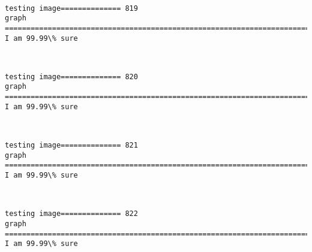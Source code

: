 \documentclass[11pt]{article}
\begin{document}
    \begin{center}
    \end{center}
    { \hspace*{\fill} \\}
    
    \begin{Verbatim}[commandchars=\\\{\}]
testing image============== 819
graph
============================================================================
I am 99.99\% sure

    \end{Verbatim}

    \begin{center}
    \end{center}
    { \hspace*{\fill} \\}
    
    \begin{Verbatim}[commandchars=\\\{\}]
testing image============== 820
graph
============================================================================
I am 99.99\% sure

    \end{Verbatim}

    \begin{center}
    \end{center}
    { \hspace*{\fill} \\}
    
    \begin{Verbatim}[commandchars=\\\{\}]
testing image============== 821
graph
============================================================================
I am 99.99\% sure

    \end{Verbatim}

    \begin{center}
    \end{center}
    { \hspace*{\fill} \\}
    
    \begin{Verbatim}[commandchars=\\\{\}]
testing image============== 822
graph
============================================================================
I am 99.99\% sure

    \end{Verbatim}
\end{document}
